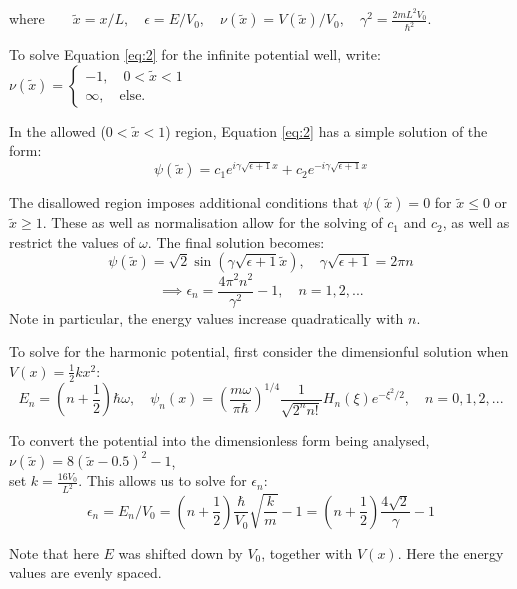 \documentclass[11pt]{article}
\begin{document}
where$\qquad\tilde{x}=x/L,\quad \epsilon=E/V_0,\quad \nu(\tilde{x})=V(\tilde{x})/V_0,\quad \gamma^2=\frac{2mL^2V_0}{\hbar^2}$.

To solve Equation \ref{eq:2} for the infinite potential well, write:
$  \nu(\tilde{x})=
  \begin{cases}
    -1,\quad 0<\tilde{x}<1\\
    \infty,\quad \text{else.}
  \end{cases}$

In the allowed ($0<\tilde{x}<1$) region, Equation \ref{eq:2} has
a simple solution of the form:
$$\psi(\tilde{x})=c_1 e^{i \gamma \sqrt{\epsilon+1} x} +c_2 e^{-i \gamma \sqrt{\epsilon+1} x}$$

The disallowed region imposes additional conditions that $\psi(\tilde{x})=0$
for $\tilde{x}\leq0$ or $\tilde{x}\geq1$. These as well as normalisation
allow for the solving of $c_1$ and
$c_2$, as well as restrict the values of $\omega$. The final solution becomes:
\begin{equation}
  \psi(\tilde{x})=\sqrt{2}\sin(\gamma \sqrt{\epsilon+1} \tilde{x}),\quad \gamma\sqrt{\epsilon+1}=2\pi n
\end{equation}
\begin{equation}
  \implies \epsilon_n=\frac{4\pi^2n^2}{\gamma^2}-1,\quad n=1,2,...
  \label{eq:epsilon}
\end{equation}
Note in particular, the energy values increase quadratically with $n$.

To solve for the harmonic potential, first consider the dimensionful solution when
$V(x)=\frac{1}{2}k x^2$\cite{grif}:
\begin{equation}
  E_n=(n+\frac{1}{2})\hbar \omega,
  \quad \psi_n(x)=\left(\frac{m\omega}{\pi \hbar}\right)^{1/4}\frac{1}{\sqrt{2^n n!}}H_n(\xi)e^{-\xi^2/2},
  \quad n=0,1,2,...
\end{equation}

To convert the potential into the dimensionless form being analysed,
$\nu(\tilde{x})=8(\tilde{x}-0.5)^2-1$,\\
 set $k=  \frac{16V_0}{L^2}$.  This allows us to solve for $\epsilon_n$:
\begin{equation}
  \epsilon_n=E_n/V_0=(n+\frac{1}{2})\frac{\hbar}{V_0}\sqrt{\frac{k}{m}}-1=
  (n+\frac{1}{2})\frac{4\sqrt{2}}{\gamma}-1
\end{equation}

Note that here $E$ was shifted down by $V_0$, together with $V(x)$.
Here the energy values are evenly spaced.
\end{document}
